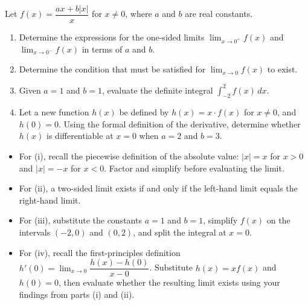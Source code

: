 \begin{problem}
Let $f(x) = \dfrac{ax + b|x|}{x}$ for $x \neq 0$, where $a$ and $b$ are real constants.
\begin{enumerate}[label=(\roman*)]
    \item Determine the expressions for the one-sided limits $\lim_{x \to 0^+} f(x)$ and $\lim_{x \to 0^-} f(x)$ in terms of $a$ and $b$.
    \item Determine the condition that must be satisfied for $\lim_{x \to 0} f(x)$ to exist.
    \item Given $a = 1$ and $b = 1$, evaluate the definite integral $\displaystyle \int_{-2}^{2} f(x) \, dx$.
    \item Let a new function $h(x)$ be defined by $h(x) = x \cdot f(x)$ for $x \neq 0$, and $h(0) = 0$. Using the formal definition of the derivative, determine whether $h(x)$ is differentiable at $x = 0$ when $a = 2$ and $b = 3$.
\end{enumerate}
\end{problem}

\begin{hint}
\begin{itemize}[leftmargin=*]
    \item For (i), recall the piecewise definition of the absolute value: $|x| = x$ for $x > 0$ and $|x| = -x$ for $x < 0$. Factor and simplify before evaluating the limit.
    \item For (ii), a two-sided limit exists if and only if the left-hand limit equals the right-hand limit.
    \item For (iii), substitute the constants $a = 1$ and $b = 1$, simplify $f(x)$ on the intervals $(-2, 0)$ and $(0, 2)$, and split the integral at $x = 0$.
    \item For (iv), recall the first-principles definition $h'(0) = \lim_{x \to 0} \dfrac{h(x) - h(0)}{x - 0}$. Substitute $h(x) = x f(x)$ and $h(0) = 0$, then evaluate whether the resulting limit exists using your findings from parts (i) and (ii).
\end{itemize}
\end{hint}

